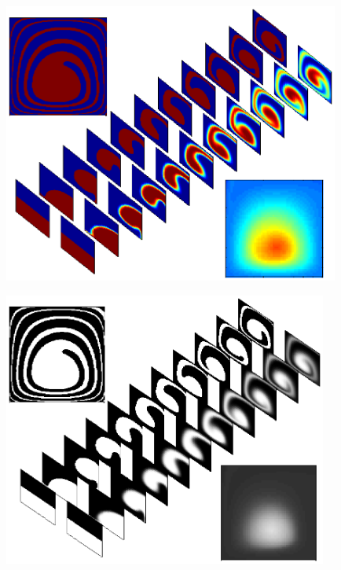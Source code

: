 \documentclass[12pt,t]{beamer}
\begin{document}
\begin{frame}
\begin{center}
\includegraphics[width=0.83\textwidth,trim=0cm 1cm 0cm 0.5cm,clip]{markovvsexact}
\end{center}
\end{frame}

\begin{frame}
\centerline{
\includegraphics[width=0.8\textwidth,trim=1cm 1cm 0cm 0.5cm,clip]{markovvsexact2}
}

\end{frame}
\end{document}
